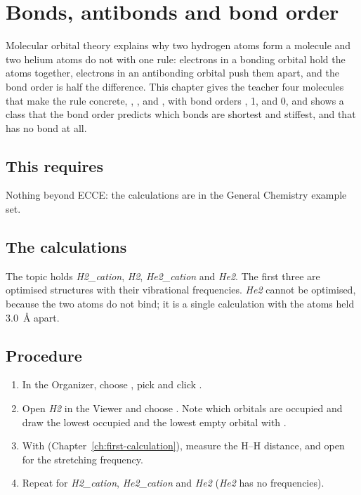 \chapter{Bonds, antibonds and bond order}
\label{ch:t-bond-order}

Molecular orbital theory explains why two hydrogen atoms form a molecule and two helium atoms do not with one rule: electrons in a bonding orbital hold the atoms together, electrons in an antibonding orbital push them apart, and the bond order is half the difference. This chapter gives the teacher four molecules that make the rule concrete, , ,  and , with bond orders \textonehalf, 1, \textonehalf{} and 0, and shows a class that the bond order predicts which bonds are shortest and stiffest, and that  has no bond at all.

\section*{This requires}
Nothing beyond ECCE: the calculations are in the General Chemistry example set.

\section{The calculations}
The topic  holds \emph{H2\_cation}, \emph{H2}, \emph{He2\_cation} and \emph{He2}. The first three are optimised structures with their vibrational frequencies. \emph{He2} cannot be optimised, because the two atoms do not bind; it is a single calculation with the atoms held \SI{3.0}{\angstrom} apart.

\section{Procedure}
\begin{enumerate}
	\item In the Organizer, choose , pick  and click .
	\item Open \emph{H2} in the Viewer and choose . Note which orbitals are occupied and draw the lowest occupied and the lowest empty orbital with .
	\item With  (Chapter~\ref{ch:first-calculation}), measure the H--H distance, and open  for the stretching frequency.
	\item Repeat for \emph{H2\_cation}, \emph{He2\_cation} and \emph{He2} (\emph{He2} has no frequencies).
\end{enumerate}

